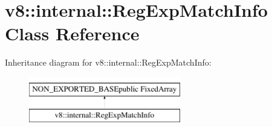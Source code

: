\hypertarget{classv8_1_1internal_1_1RegExpMatchInfo}{}\section{v8\+:\+:internal\+:\+:Reg\+Exp\+Match\+Info Class Reference}
\label{classv8_1_1internal_1_1RegExpMatchInfo}
Inheritance diagram for v8\+:\+:internal\+:\+:Reg\+Exp\+Match\+Info\+:\begin{figure}[H]
\begin{center}
\leavevmode
\includegraphics[height=2.000000cm]{classv8_1_1internal_1_1RegExpMatchInfo}
\end{center}
\end{figure}
